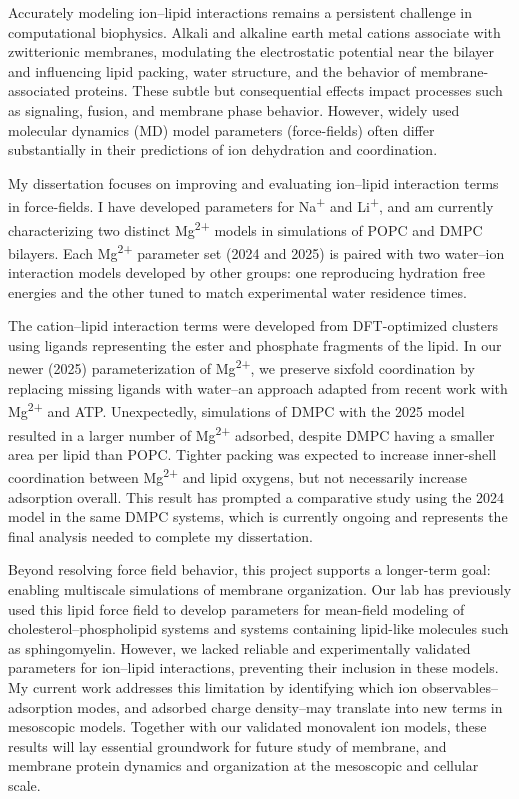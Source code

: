 \documentclass{article}
\newcommand{\na}{Na\textsuperscript{+}}
\newcommand{\li}{Li\textsuperscript{+}}
\newcommand{\mg}{Mg\textsuperscript{2+}}
\begin{document}
Accurately modeling ion--lipid interactions remains a persistent challenge in computational biophysics.
Alkali and alkaline earth metal cations associate with zwitterionic membranes, modulating the electrostatic
potential near the bilayer and influencing lipid packing, water structure, and the behavior of membrane-
associated proteins. These subtle but consequential effects impact processes such as signaling, fusion, and
membrane phase behavior. However, widely used molecular dynamics (MD) model parameters (force-fields) often differ substantially
in their predictions of ion dehydration and coordination.

My dissertation focuses on improving and evaluating ion--lipid interaction terms in force-fields.
I have developed parameters for \na{} and \li{}, and am currently characterizing two distinct \mg{} models
in simulations of POPC and DMPC bilayers. Each \mg{} parameter set (2024 and 2025) is paired with
two water--ion interaction models developed by other groups: one reproducing hydration free energies and the
other tuned to match experimental water residence times. 

The cation--lipid interaction terms were developed from DFT-optimized clusters using ligands representing the 
ester and phosphate fragments of the lipid.
In our newer (2025) parameterization of \mg, we preserve sixfold coordination by replacing missing ligands with
water--an approach adapted from recent work with \mg{} and ATP. Unexpectedly, simulations of DMPC
with the 2025 model resulted in a larger number of \mg{} adsorbed, despite DMPC having a smaller area per lipid than POPC.
Tighter packing was expected to increase inner-shell coordination between \mg{} and lipid oxygens, but not necessarily increase adsorption overall. 
This result has prompted a comparative study using the 2024 model in the same DMPC
systems, which is currently ongoing and represents the final analysis needed to complete my dissertation.

Beyond resolving force field behavior, this project supports a longer-term goal: enabling multiscale
simulations of membrane organization. Our lab has previously used this lipid force field to develop parameters for mean-field modeling of
cholesterol--phospholipid systems and systems containing lipid-like molecules such as sphingomyelin.
However, we lacked reliable and experimentally validated parameters for ion--lipid interactions, 
preventing their inclusion in these models. My current work addresses this limitation by
identifying which ion observables--adsorption modes, and adsorbed charge density--may
translate into new terms in mesoscopic models. Together with our validated monovalent ion models, these
results will lay essential groundwork for future study of membrane, and membrane protein dynamics and organization 
at the mesoscopic and cellular scale.
\end{document}
